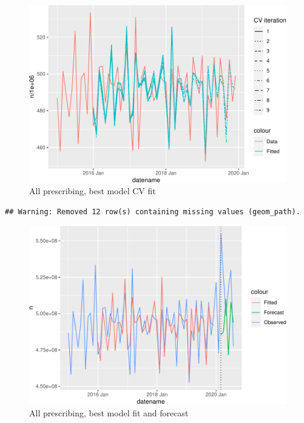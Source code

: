 \documentclass[
  english,
  man,floatsintext]{apa7}
\begin{document}
\begin{figure}
\centering
\includegraphics{paper_files/figure-latex/all-prescribing-cv-plot-1.pdf}
\caption{\label{fig:all-prescribing-cv-plot}All prescribing, best model CV fit}
\end{figure}

\begin{verbatim}
## Warning: Removed 12 row(s) containing missing values (geom_path).
\end{verbatim}

\begin{figure}
\centering
\includegraphics{paper_files/figure-latex/all-prescribing-forecast-plot-1.pdf}
\caption{\label{fig:all-prescribing-forecast-plot}All prescribing, best model fit and forecast}
\end{figure}
\end{document}
